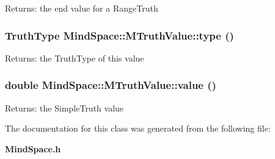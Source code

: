 \begin{Desc}
\item[Returns:]the end value for a Range\-Truth \end{Desc}
\subsubsection{\setlength{\rightskip}{0pt plus 5cm}\bf{Truth\-Type} Mind\-Space::MTruth\-Value::type ()\hspace{0.3cm}{\tt  [inline]}}\label{classMindSpace_1_1MTruthValue_c0d0c348838efbcaf80b399738585587}


\begin{Desc}
\item[Returns:]the Truth\-Type of this value \end{Desc}
\subsubsection{\setlength{\rightskip}{0pt plus 5cm}double Mind\-Space::MTruth\-Value::value ()\hspace{0.3cm}{\tt  [inline]}}\label{classMindSpace_1_1MTruthValue_aeb28096520f5285d857a2595e0eefed}


\begin{Desc}
\item[Returns:]the Simple\-Truth value \end{Desc}


The documentation for this class was generated from the following file:\begin{CompactItemize}
\item 
\bf{Mind\-Space.h}\end{CompactItemize}
